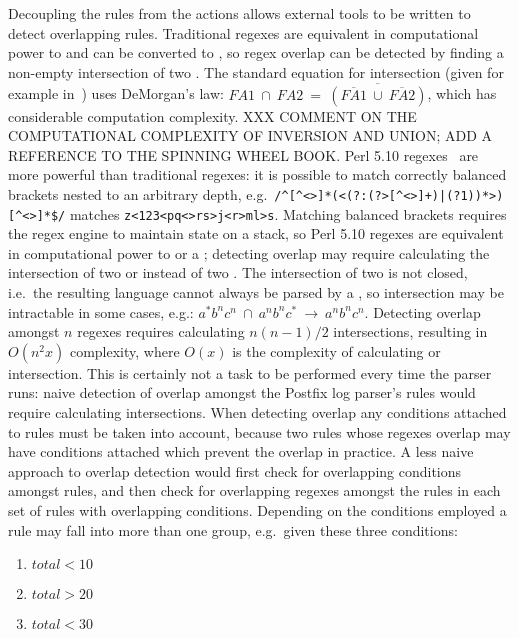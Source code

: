 Decoupling the rules from the actions allows external tools to be written
to detect overlapping rules.  Traditional regexes are equivalent in
computational power to  and can be converted to ,
so regex overlap can be detected by finding a non-empty intersection of two
\@.  The standard equation for  intersection (given
for example in~\cite{intersection-of-NFA-using-Z}) uses DeMorgan's law:
$FA1~\cap{}~FA2~=~\overline{(\overline{FA1}~\cup{}~\overline{FA2})}$, which
has considerable computation complexity.  XXX COMMENT ON THE COMPUTATIONAL
COMPLEXITY OF INVERSION AND UNION\@; ADD A REFERENCE TO THE SPINNING WHEEL
BOOK\@.  Perl 5.10 regexes~\cite{perlre} are more powerful than traditional
regexes: it is possible to match correctly balanced brackets nested to an
arbitrary depth, e.g.\ \verb!/^[^<>]*(<(?:(?>[^<>]+)|(?1))*>)[^<>]*$/!
matches \verb!z<123<pq<>rs>j<r>ml>s!.  Matching balanced brackets requires
the regex engine to maintain state on a stack, so Perl 5.10 regexes are
equivalent in computational power to  or a ;
detecting overlap may require calculating the intersection of two
 or  instead of two .  The
intersection of two  is not closed, i.e.\ the resulting
language cannot always be parsed by a , so intersection may be
intractable in some cases, e.g.:
$a^{*}b^{n}c^{n}~\cap~a^{n}b^{n}c^{*}~\rightarrow~a^{n}b^{n}c^{n}$.
Detecting overlap amongst $n$ regexes requires calculating $n(n-1)/2$
intersections, resulting in $O(n^2x)$ complexity, where $O(x)$ is the
complexity of calculating  or  intersection.  This
is certainly not a task to be performed every time the parser runs: naive
detection of overlap amongst the Postfix log parser's \numberOFrules{}
rules would require calculating \numberOFruleINTERSECTIONS{} intersections.
When detecting overlap any conditions attached to rules must be taken into
account, because two rules whose regexes overlap may have conditions
attached which prevent the overlap in practice.  A less naive approach to
overlap detection would first check for overlapping conditions amongst
rules, and then check for overlapping regexes amongst the rules in each set
of rules with overlapping conditions.  Depending on the conditions employed
a rule may fall into more than one group, e.g.\ given these three
conditions:

\begin{enumerate}

    \squeezeitems{}

    \item $total < 10$

    \item $total > 20$

    \item $total < 30$

\end{enumerate}

